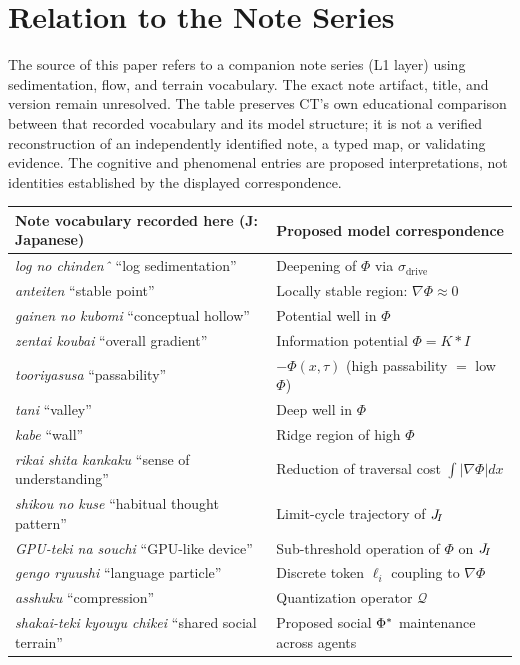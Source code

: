 
\section{Relation to the Note Series}
\label{sec:note}

The source of this paper refers to a companion note series (L1 layer)
using sedimentation, flow, and terrain vocabulary. The exact note artifact,
title, and version remain unresolved.
The table preserves CT's own educational comparison between that recorded
vocabulary and its model structure; it is not a verified reconstruction
of an independently identified note, a typed map, or validating evidence.
The cognitive and phenomenal entries are proposed interpretations, not
identities established by the displayed correspondence.

\begin{center}
\renewcommand{\arraystretch}{1.5}
\begin{tabular}{ll}
\toprule
\textbf{Note vocabulary recorded here (J: Japanese)} &
\textbf{Proposed model correspondence} \\
\midrule
\textit{log no chindenˆ} ``log sedimentation''     & Deepening of $\Phi$ via $\sigma_{\mathrm{drive}}$ \\
\textit{anteiten} ``stable point''                  & Locally stable region: $\nabla\Phi\approx 0$ \\
\textit{gainen no kubomi} ``conceptual hollow''     & Potential well in $\Phi$ \\
\textit{zentai koubai} ``overall gradient''         & Information potential $\Phi = K*I$ \\
\textit{tooriyasusa} ``passability''                & $-\Phi(x,\tau)$ (high passability $=$ low $\Phi$) \\
\textit{tani} ``valley''                            & Deep well in $\Phi$ \\
\textit{kabe} ``wall''                              & Ridge region of high $\Phi$ \\
\textit{rikai shita kankaku} ``sense of understanding'' & Reduction of traversal cost $\int|\nabla\Phi|dx$ \\
\textit{shikou no kuse} ``habitual thought pattern'' & Limit-cycle trajectory of $J_{\!I}$ \\
\textit{GPU-teki na souchi} ``GPU-like device''     & Sub-threshold operation of $\Phi$ on $J_{\!I}$ \\
\textit{gengo ryuushi} ``language particle''        & Discrete token $\ell_i$ coupling to $\nabla\Phi$ \\
\textit{asshuku} ``compression''                    & Quantization operator $\mathcal{Q}$ \\
\textit{shakai-teki kyouyu chikei} ``shared social terrain'' & Proposed social $\Phi^{*}$ maintenance across agents \\
\bottomrule
\end{tabular}
\end{center}

